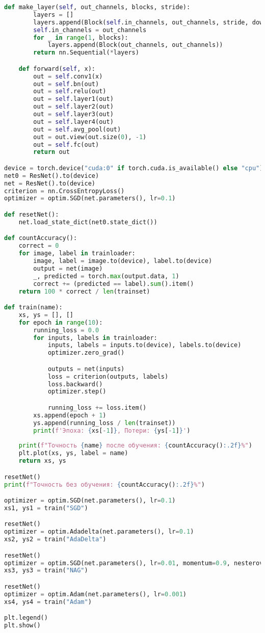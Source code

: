 \documentclass[a4paper, 14pt]{extarticle}
\begin{document}
\begin{lstlisting}[language=Python,caption={ResNet.py},label={lst:code3}]
    def make_layer(self, out_channels, blocks, stride):
        layers = []
        layers.append(Block(self.in_channels, out_channels, stride, downsampling=True))
        self.in_channels = out_channels
        for _ in range(1, blocks):
            layers.append(Block(out_channels, out_channels))
        return nn.Sequential(*layers)

    def forward(self, x):
        out = self.conv1(x)
        out = self.bn(out)
        out = self.relu(out)
        out = self.layer1(out)
        out = self.layer2(out)
        out = self.layer3(out)
        out = self.layer4(out)
        out = self.avg_pool(out)
        out = out.view(out.size(0), -1)
        out = self.fc(out)
        return out

device = torch.device("cuda:0" if torch.cuda.is_available() else "cpu")
net0 = ResNet().to(device)
net = ResNet().to(device)
criterion = nn.CrossEntropyLoss()
optimizer = optim.SGD(net.parameters(), lr=0.1)

def resetNet():
    net.load_state_dict(net0.state_dict())

def countAccuracy():
    correct = 0
    for image, label in trainloader:
        image, label = image.to(device), label.to(device)
        output = net(image)
        _, predicted = torch.max(output.data, 1)
        correct += (predicted == label).sum().item()
    return 100 * correct / len(trainset)

def train(name):
    xs, ys = [], []
    for epoch in range(10):
        running_loss = 0.0
        for inputs, labels in trainloader:
            inputs, labels = inputs.to(device), labels.to(device)
            optimizer.zero_grad()

            outputs = net(inputs)
            loss = criterion(outputs, labels)
            loss.backward()
            optimizer.step()

            running_loss += loss.item()
        xs.append(epoch + 1)
        ys.append(running_loss / len(trainset))
        print(f'Эпоха: {xs[-1]}, Потери: {ys[-1]}')
    
    print(f"Точность {name} после обучения: {countAccuracy():.2f}%")
    plt.plot(xs, ys, label = name)
    return xs, ys

resetNet()
print(f"Точность без обучения: {countAccuracy():.2f}%")

optimizer = optim.SGD(net.parameters(), lr=0.1)
xs1, ys1 = train("SGD")

resetNet()
optimizer = optim.Adadelta(net.parameters(), lr=0.1)
xs2, ys2 = train("AdaDelta")

resetNet()
optimizer = optim.SGD(net.parameters(), lr=0.01, momentum=0.9, nesterov=True)
xs3, ys3 = train("NAG")

resetNet()
optimizer = optim.Adam(net.parameters(), lr=0.001)
xs4, ys4 = train("Adam")

plt.legend()
plt.show()
\end{lstlisting}
\end{document}
